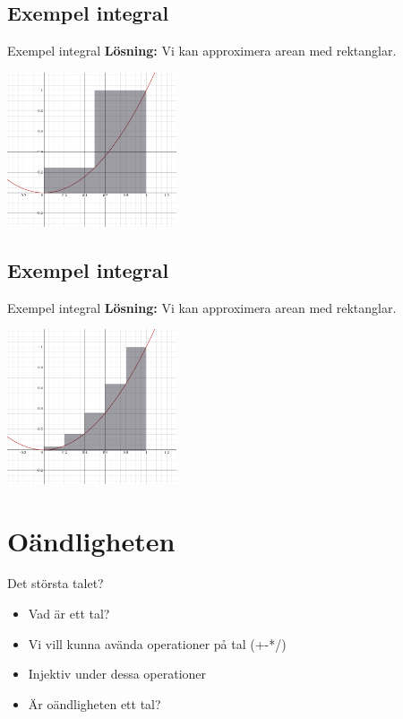 \documentclass{beamer}
\begin{document}
\subsection*{Exempel integral}
\label{sec:org2feb6bc}
\begin{frame}{Exempel integral}
\textbf{Lösning:} Vi kan approximera arean med rektanglar.

\begin{center}
\includegraphics[angle=0,width=5cm]{./img/int2.png}
\end{center}

\end{frame}



\subsection*{Exempel integral}
\label{sec:org9a33b1c}
\begin{frame}{Exempel integral}
\textbf{Lösning:} Vi kan approximera arean med rektanglar.
\begin{center}
\includegraphics[angle=0,width=5cm]{./img/int5.png}
\end{center}

\end{frame}





\section*{Oändligheten}
\label{sec:orgc171ccb}
\begin{frame}{Det största talet?}
\begin{itemize}
\item Vad är ett tal?
\item Vi vill kunna avända operationer på tal (+-*/)
\item Injektiv under dessa operationer
\item Är oändligheten ett tal?
\end{itemize}
\end{frame}
\end{document}
